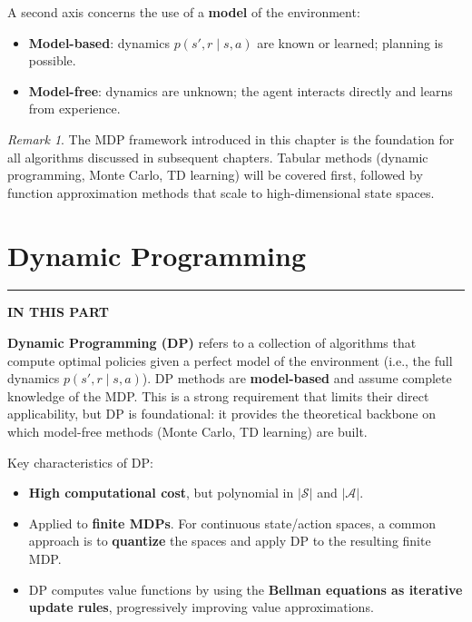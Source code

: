 \documentclass[11pt,a4paper]{article}
\theoremstyle{definition}
\theoremstyle{plain}
\theoremstyle{remark}
\newtheorem*{remark}{Remark}
\newcommand{\partmtoc}{%
  \vspace{2pt}%
  {\color{rlrule}\rule{\linewidth}{0.5pt}}\par\vspace{3pt}%
  {\footnotesize\bfseries\color{rlaccent}IN THIS PART}\par\vspace{2pt}%
  \begingroup
  \etocsetnexttocdepth{subsection}%
  \localtableofcontents
  \endgroup
  \vspace{2pt}{\color{rlrule}\rule{\linewidth}{0.5pt}}\par\vspace{10pt}}
\begin{document}
A second axis concerns the use of a \textbf{model} of the environment:
\begin{itemize}
    \item \textbf{Model-based}: dynamics $p(s', r \mid s, a)$ are known or learned; planning is possible.
    \item \textbf{Model-free}: dynamics are unknown; the agent interacts directly and learns from experience.
\end{itemize}

\begin{remark}
The MDP framework introduced in this chapter is the foundation for all algorithms discussed in subsequent chapters. Tabular methods (dynamic programming, Monte Carlo, TD learning) will be covered first, followed by function approximation methods that scale to high-dimensional state spaces.
\end{remark}


\part{Dynamic Programming}
\partmtoc

\textbf{Dynamic Programming (DP)} refers to a collection of algorithms that compute optimal policies given a perfect model of the environment (i.e., the full dynamics $p(s', r \mid s, a)$). DP methods are \textbf{model-based} and assume complete knowledge of the MDP. This is a strong requirement that limits their direct applicability, but DP is foundational: it provides the theoretical backbone on which model-free methods (Monte Carlo, TD learning) are built.

Key characteristics of DP:
\begin{itemize}
    \item \textbf{High computational cost}, but polynomial in $|\mathcal{S}|$ and $|\mathcal{A}|$.
    \item Applied to \textbf{finite MDPs}. For continuous state/action spaces, a common approach is to \textbf{quantize} the spaces and apply DP to the resulting finite MDP.
    \item DP computes value functions by using the \textbf{Bellman equations as iterative update rules}, progressively improving value approximations.
\end{itemize}

\end{document}
